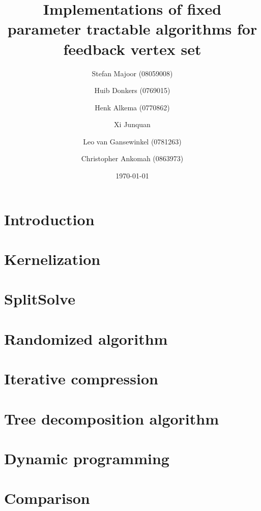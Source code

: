 \documentclass[a4paper,10pt]{article}
\title{Implementations of fixed parameter tractable algorithms for feedback vertex set}
\author{
	Stefan Majoor (08059008)
	\and
	Huib Donkers (0769015)
	\and
	Henk Alkema (0770862)
	\and
	Xi Junquan
	\and
	Leo van Gansewinkel (0781263)
	\and
	Christopher Ankomah (0863973)
}
\date{\today}
\begin{document}
\maketitle
\setcounter{tocdepth}{2}
\tableofcontents
\clearpage

\begin{abstract}

\end{abstract}

\section{Introduction} \label{sec:intro}


\section{Kernelization} \label{sec:kern}


\section{SplitSolve} \label{sec:splitsolve}


\section{Randomized algorithm} \label{sec:rand}


\section{Iterative compression} \label{sec:itcomp}


\section{Tree decomposition algorithm} \label{sec:treewidth}


\section{Dynamic programming} \label{sec:dynamic program}


\section{Comparison} \label{sec:comparison}

\end{document}
